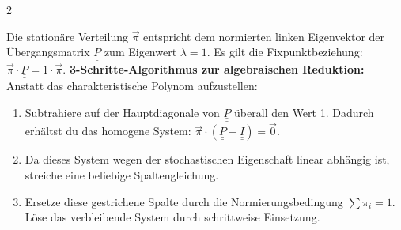 \documentclass[a4paper, 9pt]{extarticle}
\begin{document}
\begin{multicols*}{2}
\begin{tcolorbox}[title={Das vereinfachte Eigenwert-Prinzip (Handrechnung)}, colframe=markovviolet, colback=markovviolet!5, colbacktitle=markovviolet]
Die stationäre Verteilung $\vec{\pi}$ entspricht dem normierten linken Eigenvektor der Übergangsmatrix $\underline{\underline{P}}$ zum Eigenwert $\lambda = 1$. Es gilt die Fixpunktbeziehung: $\vec{\pi} \cdot \underline{\underline{P}} = 1 \cdot \vec{\pi}$.
\smallskip
\textbf{3-Schritte-Algorithmus zur algebraischen Reduktion:}
\\Anstatt das charakteristische Polynom aufzustellen:
\begin{enumerate}
    \item Subtrahiere auf der Hauptdiagonale von $\underline{\underline{P}}$ überall den Wert 1. Dadurch erhältst du das homogene System: $\vec{\pi} \cdot (\underline{\underline{P}} - \underline{\underline{I}}) = \vec{0}$.
    \item Da dieses System wegen der stochastischen Eigenschaft linear abhängig ist, streiche eine beliebige Spaltengleichung.
    \item Ersetze diese gestrichene Spalte durch die Normierungsbedingung $\sum \pi_i = 1$. Löse das verbleibende System durch schrittweise Einsetzung.
\end{enumerate}
\end{tcolorbox}


\end{multicols*}
\end{document}
